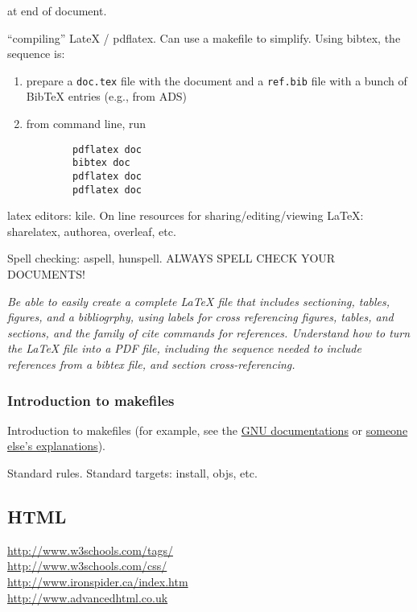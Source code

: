 \documentclass{article}
\newcommand{\test}[1]{%
    \begin{center}
        \colorbox{hl}{\parbox{0.9\textwidth}{\emph{#1}}}
    \end{center}}
\begin{document}
\verb||  at end of document.

``compiling'' LateX / pdflatex. Can use a makefile to simplify. Using
bibtex, the sequence is:
\begin{enumerate}
    \item prepare a {\tt doc.tex} file with the document and a
        {\tt ref.bib} file with a bunch of BibTeX entries
        (e.g., from ADS)
    \item from command line, run
        \begin{verbatim}
        pdflatex doc
        bibtex doc
        pdflatex doc
        pdflatex doc
        \end{verbatim}
\end{enumerate}
latex editors: kile. On line resources for sharing/editing/viewing
LaTeX: sharelatex, authorea, overleaf, etc.

Spell checking: aspell, hunspell. ALWAYS SPELL CHECK YOUR DOCUMENTS!

\test{Be able to easily create a complete LaTeX file that includes
sectioning, tables, figures, and a bibliogrphy, using labels for cross
referencing figures, tables, and sections, and the family of cite
commands for references. Understand how to turn the LaTeX file into a
PDF file, including the sequence needed to include references from a
bibtex file, and section cross-referencing.}

\subsubsection{Introduction to makefiles}
Introduction to makefiles (for example, see the
\href{https://www.gnu.org/software/make/manual/html_node/index.html#Top}
{GNU documentations} or
\href{http://www.rsmas.miami.edu/personal/miskandarani/Courses/MSC321/make.pdf}
{someone else's explanations}).

Standard rules. Standard targets: install, objs, etc.

\subsection{HTML}

\url{http://www.w3schools.com/tags/}\\
\url{http://www.w3schools.com/css/}\\
\url{http://www.ironspider.ca/index.htm}\\
\url{http://www.advancedhtml.co.uk}\\
\end{document}
